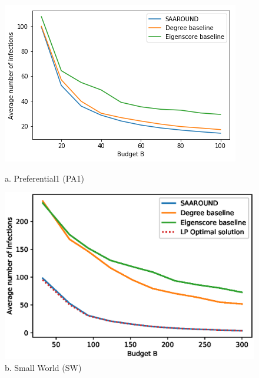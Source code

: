 
\begin{figure}[ht] 
  \begin{minipage}[b]{0.5\linewidth}
    \centering
    \includegraphics[scale=0.48]{Figuresnew/pa1_approx} 
    \caption*{a. Preferential1 (PA1)} 
    \vspace{1ex}
  \end{minipage}%
  \begin{minipage}[b]{0.5\linewidth}
    \centering
    \includegraphics[scale=0.48]{Figuresnew/smallworld_approx} 
    \caption*{b. Small World (SW)} 
    \vspace{1ex}
  \end{minipage} 
  \begin{minipage}[b]{0.5\linewidth}

\end{minipage}
\end{figure}

